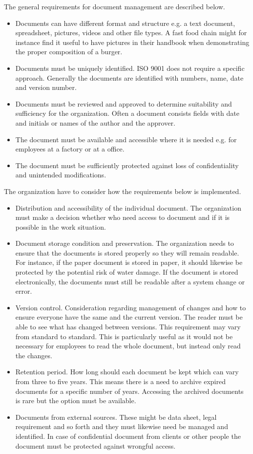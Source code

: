 The general requirements for document management are described below.
\begin{itemize}
	\item Documents can have different format and structure e.g. a text document, spreadsheet, pictures, videos and other file types. A fast food chain might for instance find it useful to have pictures in their handbook when demonstrating the proper composition of a burger.
	\item Documents must be uniquely identified. ISO 9001 does not require a specific approach. Generally the documents are identified with numbers, name, date and version number.
	\item Documents must be reviewed and approved to determine suitability and sufficiency for the organization. Often a document consists fields with date and initials or names of the author and  the approver.
	\item The document must be available and accessible where it is needed e.g. for employees at a factory or at a office.
	\item The document must be sufficiently protected against loss of confidentiality and unintended modifications.
\end{itemize}

The organization have to consider how  the requirements below is implemented.

\begin{itemize}
	\item Distribution and accessibility of the individual document. The organization must make a decision whether who need access to document and if it is possible in the work situation.
	\item Document storage condition and preservation. The organization needs to ensure that the documents is stored properly so they will remain readable. For instance, if the paper document is stored in paper, it should likewise be protected by the potential risk of water damage. If the document is stored electronically, the documents must still be readable after a system change or error.
	\item Version control. Consideration regarding management of changes and how to ensure everyone have the same and the current version. The reader must be able to see what has changed between versions. This requirement may vary from standard to standard. This is particularly useful as it would not be necessary for employees to read the whole document, but instead only read the changes.
	\item Retention period. How long should each document be kept which can vary from three to five years. This means there is a need to archive expired documents for a specific number of years. Accessing the archived documents is rare but the option must be available.
	\item Documents from external sources. These might be data sheet, legal requirement and so forth and they must likewise need be managed and identified. In case of confidential document from clients or other people the document must be protected against wrongful access.
\end{itemize}

